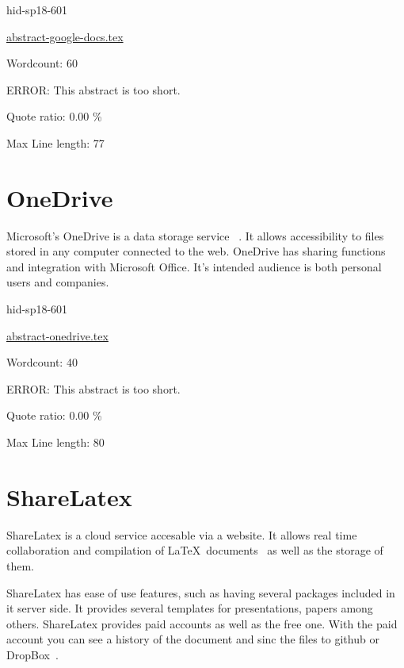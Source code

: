 \begin{IU}

hid-sp18-601

\href{https://github.com/cloudmesh-community/hid-sp18-601/blob/master//technology/abstract-google-docs.tex}{abstract-google-docs.tex}

 

Wordcount: 60

ERROR: This abstract is too short.


Quote ratio: 0.00 \%
 
Max Line length: 77
\end{IU}

\section{OneDrive}

Microsoft's OneDrive is a data storage service 
~\cite{hid-sp18-601-www-odrive-website}. It allows accessibility  to files
 stored in any computer connected to the web. OneDrive has sharing functions and
 integration with Microsoft Office. It's intended audience is both personal 
users and companies.

\begin{IU}

hid-sp18-601

\href{https://github.com/cloudmesh-community/hid-sp18-601/blob/master//technology/abstract-onedrive.tex}{abstract-onedrive.tex}

 

Wordcount: 40

ERROR: This abstract is too short.


Quote ratio: 0.00 \%
 
Max Line length: 80
\end{IU}

\section{ShareLatex}

ShareLatex is a cloud service accesable via a website. It allows real time 
collaboration and compilation of 
\LaTeX~documents~\cite{hid-sp18-601-www-slatex-documentation} as well as the 
storage of them. 
 
ShareLatex has ease of use features, such as having several packages included 
in it server side. It provides several templates for presentations, papers among
 others. ShareLatex provides paid accounts as well as the free one. With the 
 paid account you can see a history of the document and sinc the files to github
 or DropBox~\cite{hid-sp18-601-www-slatex-plans}.


